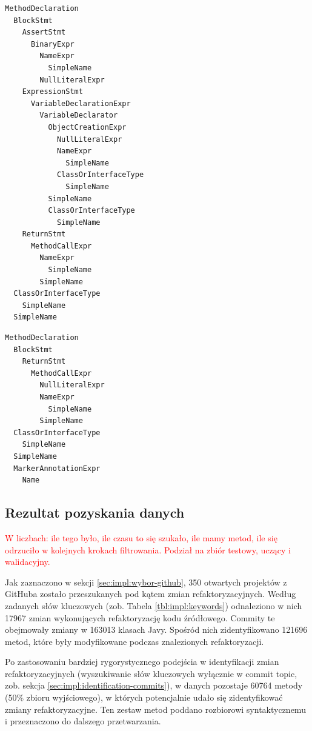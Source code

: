 \documentclass[12pt]{report}
\begin{document}
\begin{lstlisting}[frame=single,caption={\texttt{Przykładowa metoda poddana refaktoryzacji: rozbiór syntaktyczny przed zmianą}},captionpos=b,label={lst:impl:example-ast-before}]
MethodDeclaration
  BlockStmt
    AssertStmt
      BinaryExpr
        NameExpr
          SimpleName
        NullLiteralExpr
    ExpressionStmt
      VariableDeclarationExpr
        VariableDeclarator
          ObjectCreationExpr
            NullLiteralExpr
            NameExpr
              SimpleName
            ClassOrInterfaceType
              SimpleName
          SimpleName
          ClassOrInterfaceType
            SimpleName
    ReturnStmt
      MethodCallExpr
        NameExpr
          SimpleName
        SimpleName
  ClassOrInterfaceType
    SimpleName
  SimpleName
\end{lstlisting}

\begin{lstlisting}[frame=single,caption={Przykładowa metoda poddana refaktoryzacji: rozbiór syntaktyczny po zmianie},captionpos=b,label={lst:impl:example-ast-after}]
MethodDeclaration
  BlockStmt
    ReturnStmt
      MethodCallExpr
        NullLiteralExpr
        NameExpr
          SimpleName
        SimpleName
  ClassOrInterfaceType
    SimpleName
  SimpleName
  MarkerAnnotationExpr
    Name
\end{lstlisting}

\subsection{Rezultat pozyskania danych}
\label{sec:impl:results}
\textcolor{red}{W liczbach: ile tego było, ile czasu to się szukało, ile mamy metod, ile się odrzuciło w kolejnych krokach filtrowania. Podział na zbiór testowy, uczący i walidacyjny.}

Jak zaznaczono w sekcji \ref{sec:impl:wybor-github}, 350 otwartych projektów z GitHuba zostało przeszukanych pod kątem zmian refaktoryzacyjnych. Według zadanych słów kluczowych (zob. Tabela \ref{tbl:impl:keywords}) odnaleziono w nich 17967 zmian wykonujących refaktoryzację kodu źródłowego. Commity te obejmowały zmiany w 163013 klasach Javy. Spośród nich zidentyfikowano 121696 metod, które były modyfikowane podczas znalezionych refaktoryzacji.

Po zastosowaniu bardziej rygorystycznego podejścia w identyfikacji zmian refaktoryzacyjnych (wyszukiwanie słów kluczowych wyłącznie w commit topic, zob. sekcja \ref{sec:impl:identification-commits}), w danych pozostaje 60764 metody (50\% zbioru wyjściowego), w których potencjalnie udało się zidentyfikować zmiany refaktoryzacyjne. Ten zestaw metod poddano rozbiorowi syntaktycznemu i przeznaczono do dalszego przetwarzania.
\end{document}
